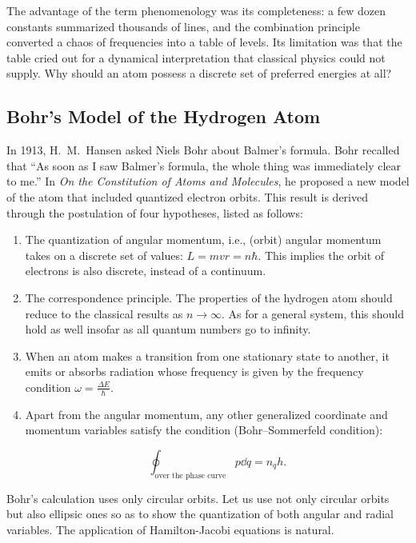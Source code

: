 The advantage of the term phenomenology was its completeness: a few dozen constants summarized thousands of lines, and the combination principle converted a chaos of frequencies into a table of levels. Its limitation was that the table cried out for a dynamical interpretation that classical physics could not supply. Why should an atom possess a discrete set of preferred energies at all?

\subsection{Bohr's Model of the Hydrogen Atom}
In 1913, H.~M.~Hansen asked Niels Bohr about Balmer's formula. Bohr recalled that ``As soon as I saw Balmer's formula, the whole thing was immediately clear to me.'' In \emph{On the Constitution of Atoms and Molecules}, he proposed a new model of the atom that included quantized electron orbits. This result is derived through the postulation of four hypotheses, listed as follows:
\begin{enumerate}
    \item The quantization of angular momentum, i.e., (orbit) angular momentum takes on a discrete set of values: $L = mvr = n\hbar.$ This implies the orbit of electrons is also discrete, instead of a continuum.
    \item The correspondence principle. The properties of the hydrogen atom should reduce to the classical results as $n\to \infty.$ As for a general system, this should hold as well insofar as all quantum numbers go to infinity.
    \item When an atom makes a transition from one stationary state to another, it emits or absorbs radiation whose frequency is given by the frequency condition $\omega = \frac{\Delta E}{\hbar}.$
    \item Apart from the angular momentum, any other generalized coordinate and momentum variables satisfy the condition (Bohr--Sommerfeld condition):\begin{linenomath}
        \begin{equation}
            \oint_{\text{over the phase curve}} p\dd q = n_qh.
        \end{equation}
    \end{linenomath}
\end{enumerate}
Bohr's calculation uses only circular orbits. Let us use not only circular orbits but also ellipsic ones so as to show the quantization of both angular and radial variables. The application of Hamilton-Jacobi equations is natural.

